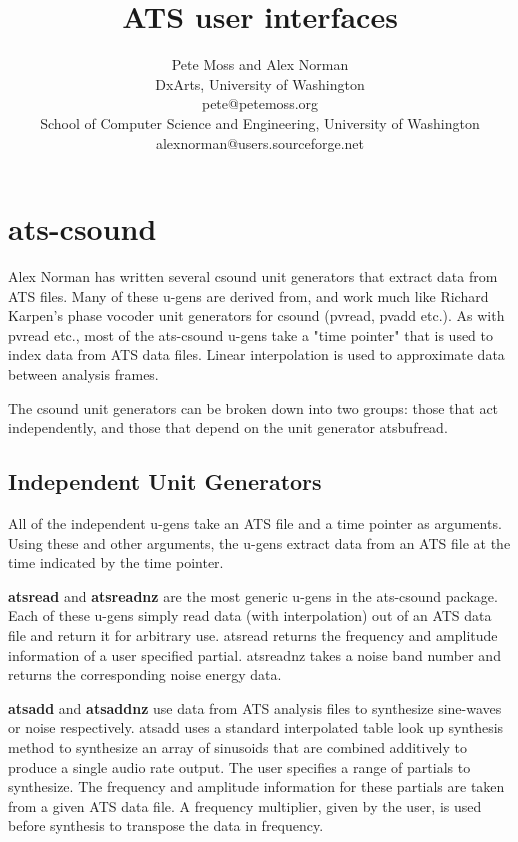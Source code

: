 \documentclass[10pt,letterpaper]{article}
\begin{document}
\twocolumn

\title{\textbf{ATS user interfaces}}
\author{
Pete Moss and Alex Norman\\
DxArts, University of Washington\\
pete@petemoss.org\\
School of Computer Science and Engineering, University of Washington\\
alexnorman@users.sourceforge.net\\
}
\date{}     %
\maketitle

\pagestyle{empty}          %
\thispagestyle{empty}      %


\section{ats-csound}
Alex Norman has written several csound unit generators that extract data from ATS files.  Many of these u-gens are derived from, and work much like Richard Karpen's phase vocoder unit generators for csound (pvread, pvadd etc.).  As with pvread etc., most of the ats-csound u-gens take a "time pointer" that is used to index data from ATS data files.  Linear interpolation is used to approximate data between analysis frames.

The csound unit generators can be broken down into two groups: those that act independently, and those that depend on the unit generator atsbufread.

\subsection{Independent Unit Generators}
All of the independent u-gens take an ATS file and a time pointer as arguments.  Using these and other arguments, the u-gens extract data from an ATS file at the time indicated by the time pointer.

\textbf{atsread} and \textbf{atsreadnz} are the most generic u-gens in the ats-csound package.  Each of these u-gens simply read data (with interpolation) out of an ATS data file and return it for arbitrary use.  atsread returns the frequency and amplitude information of a user specified partial.  atsreadnz takes a noise band number and returns the corresponding noise energy data.

\textbf{atsadd} and \textbf{atsaddnz} use data from ATS analysis files to synthesize sine-waves or noise respectively.  atsadd uses a standard interpolated table look up synthesis method to synthesize an array of sinusoids that are combined additively to produce a single audio rate output.  The user specifies a range of partials to synthesize.  The frequency and amplitude information for these partials are taken from a given ATS data file.  A frequency multiplier, given by the user, is used before synthesis to transpose the data in frequency.
\end{document}
